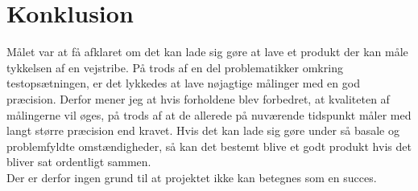 \section{Konklusion}
Målet var at få afklaret om det kan lade sig gøre at lave et produkt der kan måle tykkelsen af en vejstribe. På trods af en del problematikker omkring testopsætningen, er det lykkedes at lave nøjagtige målinger med en god præcision.
Derfor mener jeg at hvis forholdene blev forbedret, at kvaliteten af målingerne vil øges, på trods af at de allerede på nuværende tidspunkt måler med langt større præcision end kravet. Hvis det kan lade sig gøre under så basale og problemfyldte omstændigheder, så kan det bestemt blive et godt produkt hvis det bliver sat ordentligt sammen.
\\
Der er derfor ingen grund til at projektet ikke kan betegnes som en succes.